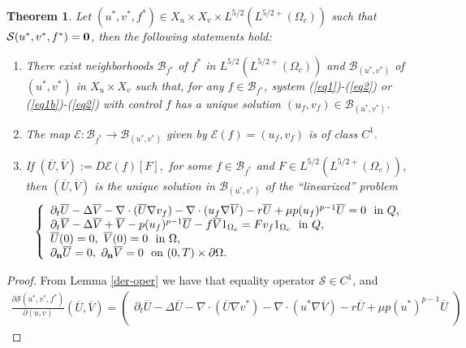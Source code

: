 \documentclass[11pt,reqno]{amsart}%
\newtheorem{theorem}{Theorem}[section]
\numberwithin{equation}{section}
\begin{document}
{\begin{theorem}
Let $(u^*,v^*,f^*)\in {X}_{u}  \times {X}_{v} \times L^{5/2}(L^{5/2+}(\Omega_c))$ such that $\mathcal{S}(u^*,v^*,f^*)=\bf 0$, 
then the following statements hold:
\begin{enumerate}
\item [i)] There exist neighborhoods $\mathcal{B}_{f ^*}$ of $f^*$ in $ L^{5/2}(L^{5/2+}(\Omega_c))$ 
and $\mathcal{B}_{(u^*,v^*)}$ of $(u^*,v^*)$ in $X_u\times X_v$ such that, for any $f\in\mathcal{B}_{f^*}$,  
system (\ref{eq1})-(\ref{eq2}) or (\ref{eq1b})-(\ref{eq2}) with control $f$ has a unique  solution $(u_{f},v_{f})\in \mathcal{B}_{(u^*,v^*)}.$ 
\item  [ii)] The map $\mathcal{E}:\mathcal{B}_{f^*} \rightarrow \mathcal{B}_{(u^*,v^*)}$ given by $\mathcal{E}(f)=(u_{f},v_{f})$ is of class $C^1.$ 
\item  [iii)] If $(\overline{U},\overline{V}):=D\mathcal{E}(f)[F],$ for some $f\in \mathcal{B}_{f^*}$ and $F\in L^{5/2}(L^{5/2+}(\Omega_c))$,
 then $(\overline{U},\overline{V})$ %
  is the unique  solution in $\mathcal{B}_{(u^*,v^*)}$ of the ``linearized'' problem 
\begin{align}
	\left\{
	\begin{array}
		[c]{lll}%
		\partial_t \overline{U}-\Delta \overline{V} -\nabla\cdot (\overline{U}\nabla v_{f})
		- \nabla\cdot(u_{f}\nabla \overline{V})
		-r \overline{U} + \mu p(u_{f})^{p-1} \overline{U}=0\ \mbox{ in $Q$,} \\
		\partial_t \overline{V} -\Delta \overline{V} + \overline{V} - p (u_{f})^{p-1} {\overline{U}} - f\overline{V}1_{\Omega_c}
		= F v_f 1_{\Omega_c}\ \mbox{ in $Q$,}\\
		\overline{U}(0)=0, \ \overline{V}(0)=0\ \mbox{ in $\Omega$,}\\	
		\partial_{\bf n} \overline{U}=0,\ \partial_{\bf n} \overline{V}=0\ \mbox{ on $(0,T)\times\partial\Omega$.}
	\end{array}
	\right.  \label{eq1eb}%
\end{align}
\end{enumerate}
\end{theorem}
\begin{proof}
From Lemma \ref{der-oper} we have that equality operator $\mathcal{S}\in C^1$, and 
\begin{eqnarray*}
\frac{\partial\mathcal{S}(u^*,v^*,f^*)}{\partial(u,v)}(\overline{U},\overline{V})=
\begin{pmatrix}
\partial_t \overline{U}-\Delta \overline{U} -\nabla\cdot (\overline{U}\nabla v^*)- \nabla\cdot(u^*\nabla \overline{V})-r \overline{U}+\mu p(u^*)^{p-1}\overline{U} \\

\end{pmatrix}
\end{eqnarray*}
\end{proof}}
\end{document}
